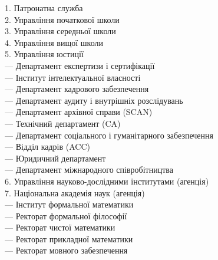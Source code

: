 1. Патронатна служба \\
2. Управління початкової школи \\
3. Управління середньої школи \\
4. Управління вищої школи \\
5. Управління юстиції \\
\hspace*{0.25cm}     — Департамент експертизи і сертифікації \\
\hspace*{0.25cm}     — Інститут інтелектуальної власності \\
\hspace*{0.25cm}     — Департамент кадрового забезпечення \\
\hspace*{0.25cm}     — Департамент аудиту і внутрішніх розслідувань \\
\hspace*{0.25cm}     — Департамент архівної справи (SCAN) \\
\hspace*{0.25cm}     — Технічний департамент (CA) \\
\hspace*{0.25cm}     — Департамент соціального і гуманітарного забезпечення \\
\hspace*{0.25cm}     — Відділ кадрів (ACC) \\
\hspace*{0.25cm}     — Юридичний департамент \\
\hspace*{0.25cm}     — Департамент міжнародного співробітництва \\
6. Управління науково-дослідними інститутами (агенція) \\
7. Національна академія наук (агенція) \\
\hspace*{0.25cm}     — Інститут формальної математики \\
\hspace*{0.7cm}         — Ректорат формальної філософії \\
\hspace*{0.7cm}         — Ректорат чистої математики \\
\hspace*{0.7cm}         — Ректорат прикладної математики \\
\hspace*{0.7cm}         — Ректорат мовного забезпечення \\
